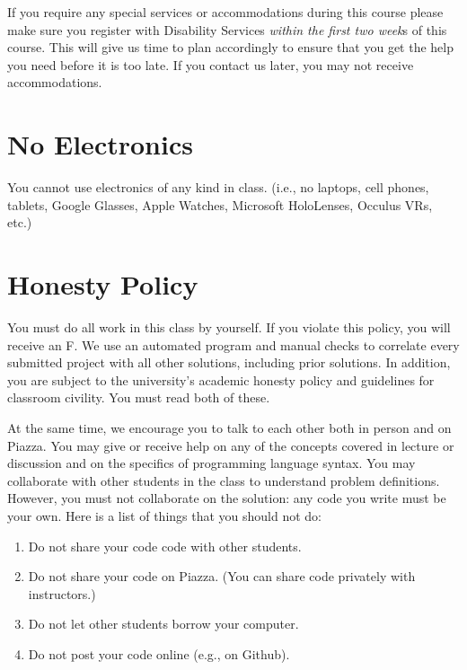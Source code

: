 \documentclass{article}
\begin{document}
If you require any special services or accommodations during this course please
make sure you register with Disability Services \emph{within the first two week}s of
this course. This will give us time to plan accordingly to ensure that you get
the help you need before it is too late. If you contact us later, you may
not receive accommodations.

\section{No Electronics}

You cannot use electronics of any kind in class. (i.e., no laptops, cell
phones, tablets, Google Glasses, Apple Watches, Microsoft HoloLenses, Occulus
VRs, etc.)

\section{Honesty Policy}

You must do all work in this class by yourself. If you violate this policy, you
will receive an F. We use an automated program and manual checks to correlate
every submitted project with all other solutions, including prior solutions. In
addition, you are subject to the university's academic honesty policy and
guidelines for classroom civility. You must read both of these.

At the same time, we encourage you to talk to each other both in person and on
Piazza. You may give or receive help on any of the concepts covered in lecture
or discussion and on the specifics of programming language syntax. You may
collaborate with other students in the class to understand problem definitions.
However, you must not collaborate on the solution: any code you write must be
your own. Here is a list of things that you should not do:

\begin{enumerate}

  \item Do not share your code code with other students.

  \item Do not share your code on Piazza. (You can share code privately with
  instructors.)

  \item Do not let other students borrow your computer.

  \item Do not post your code online (e.g., on Github).

\end{enumerate}
\end{document}
